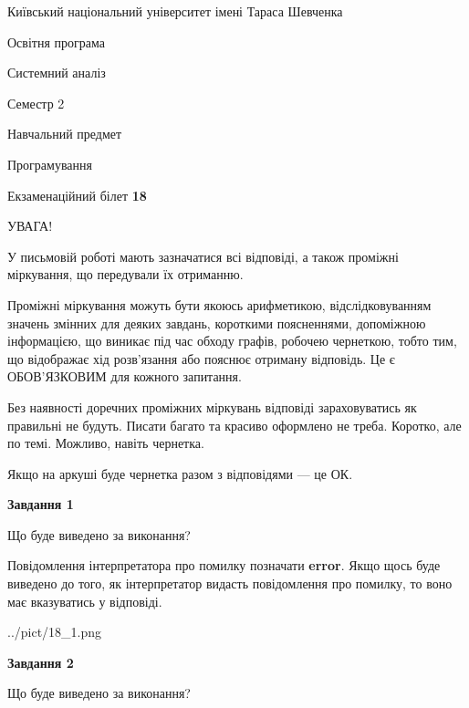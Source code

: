 \documentclass[12pt, ukrainian]{article}
\begin{document}
{{\begin {small}\par
{ \center  Київський національний університет імені Тараса Шевченка \par}
{\parbox {5 cm}{Освітня програма \hfill}{\parbox {7 cm}{Системний аналіз \hfill}}\parbox {6 cm}{\hfill Семестр 2}}\par
{\parbox {5 cm} {Навчальний предмет \hfill}\parbox {7 cm}{Програмування \hfill}\parbox {6cm}{\hfill}\par}\vspace{-7pt} \end{small}}{\center Екзаменаційний білет \No \textbf
{ 18 }\par}}
{
\begin {large}
УВАГА!

У письмовій роботі мають зазначатися всі відповіді, а також проміжні міркування, що передували їх отриманню.

Проміжні міркування можуть бути якоюсь арифметикою, відслідковуванням зна\-чень змінних для деяких завдань,
короткими поясненнями, допоміжною інформацією, що виникає під час обходу графів, робочею чернеткою,
тобто тим, що відображає хід розв’язання або пояснює отриману відповідь.
Це є ОБОВ’ЯЗКОВИМ для кожного запитання.

Без наявності доречних проміжних міркувань відповіді зараховуватись як правиль\-ні не будуть.
Писати багато та красиво оформлено не треба. Коротко, але по темі. Можли\-во, навіть чернетка.

Якщо на аркуші буде чернетка разом з відповідями --- це ОК.

\newpage

{\begin {center}\textbf{Завдання 1}\end {center}}\par
Що буде виведено за виконання?

Повідомлення інтерпретатора про помилку позначати \textbf{error}.
Якщо щось буде виведено до того, як інтерпретатор видасть повідомлення про помилку, 
то воно має вказуватись у відповіді. \par


\begin{center}
	{../pict/18_1.png}
\end{center}
\newpage

{\begin {center}\textbf{Завдання 2}\end {center}}\par
Що буде виведено за виконання?


\end{large}}
\end{document}
